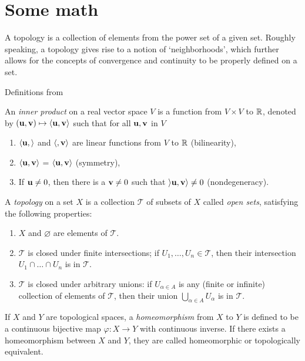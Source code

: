 %
\chapter{Some math}
A topology is a collection of elements from the power set of a given set. Roughly speaking, a topology gives rise to a notion of `neighborhoods', which further allows for the concepts of convergence and continuity to be properly defined on a set.

Definitions from \cite{Lee2000}

\begin{definition}
    An \emph{inner product} on a real vector space $V$ is a function from $V \times V$ to $\mathbb{R}$, denoted by $(\vb{u}, \vb{v}) \mapsto \langle \vb{u}, \vb{v} \rangle$ such that for all $\vb{u}, \vb{v}$ in $V$
    \begin{enumerate}
        \item $\langle \vb{u}, \rangle$ and $\langle, \vb{v}\rangle$ are linear functions from $V$ to $\mathbb{R}$ (bilinearity),
        \item $\langle \vb{u}, \vb{v} \rangle$ = $\langle \vb{u}, \vb{v} \rangle$ (symmetry),
        \item If $\vb{u} \neq 0$, then there is a $\vb{v} \neq 0$ such that $\rangle \vb{u}, \vb{v} \rangle \neq 0$ (nondegeneracy).
    \end{enumerate}
    
\end{definition}

\begin{definition}[Topology]
    A \emph{topology} on a set $X$ is a collection $\mathscr{T}$ of subsets of $X$ called \emph{open sets}, satisfying the following properties:
    \begin{enumerate}[label=\roman*]
        \item $X$ and $\varnothing$ are elements of $\mathscr{T}$.
        \item $\mathscr{T}$ is closed under finite intersections; if $U_1,\ldots,U_n \in \mathscr{T}$, then their intersection $U_1 \cap \ldots \cap U_n$ is in $\mathscr{T}$.
            \item $\mathscr{T}$ is closed under arbitrary unions: if $U_{\alpha \in A}$ is any (finite or infinite) collection of elements of $\mathscr{T}$, then their union $\displaystyle\bigcup_{\alpha \in A}  U_\alpha$ is in $\mathscr{T}$.
    \end{enumerate}
\end{definition}
\begin{definition}[Homeomorphism]
    If $X$ and $Y$ are topological spaces, a \emph{homeomorphism} from $X$ to $Y$ is defined to be a continuous bijective map $\varphi: X\to Y$ with continuous inverse. If there exists a homeomorphism between $X$ and $Y$, they are called homeomorphic or topologically equivalent.
\end{definition}

